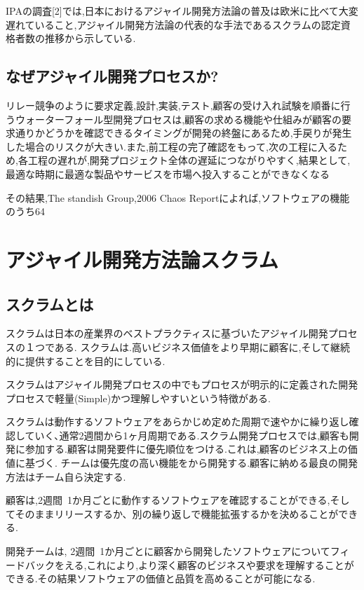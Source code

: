 \documentclass[paper]{jrsj}
\begin{document}
IPAの調査[2]では,日本におけるアジャイル開発方法論の普及は欧米に比べて大変遅れていること,アジャイル開発方法論の代表的な手法であるスクラムの認定資格者数の推移から示している.

\subsection{なぜアジャイル開発プロセスか?}
リレー競争のように要求定義,設計,実装,テスト,顧客の受け入れ試験を順番に行うウォーターフォール型開発プロセスは,顧客の求める機能や仕組みが顧客の要求通りかどうかを確認できるタイミングが開発の終盤にあるため,手戻りが発生した場合のリスクが大きい.また,前工程の完了確認をもって,次の工程に入るため,各工程の遅れが,開発プロジェクト全体の遅延につながりやすく,結果として,最適な時期に最適な製品やサービスを市場へ投入することができなくなる

その結果,The standish Group,2006 Chaos Reportによれば,ソフトウェアの機能のうち64%

\section{アジャイル開発方法論スクラム}

\subsection{スクラムとは}
スクラムは日本の産業界のベストプラクティスに基づいたアジャイル開発プロセスの１つである. スクラムは.高いビジネス価値をより早期に顧客に,そして継続的に提供することを目的にしている.

スクラムはアジャイル開発プロセスの中でもプロセスが明示的に定義された開発プロセスで軽量(Simple)かつ理解しやすいという特徴がある.

スクラムは動作するソフトウェアをあらかじめ定めた周期で速やかに繰り返し確認していく､通常2週間から1ヶ月周期である.スクラム開発プロセスでは,顧客も開発に参加する.顧客は開発要件に優先順位をつける.これは,顧客のビジネス上の価値に基づく. チームは優先度の高い機能をから開発する.顧客に納める最良の開発方法はチーム自ら決定する.

顧客は,2週間~1か月ごとに動作するソフトウェアを確認することができる,そしてそのままリリースするか、別の繰り返しで機能拡張するかを決めることができる.

開発チームは, 2週間~1か月ごとに顧客から開発したソフトウェアについてフィードバックをえる,これにより,より深く顧客のビジネスや要求を理解することができる.その結果ソフトウェアの価値と品質を高めることが可能になる.
\end{document}
